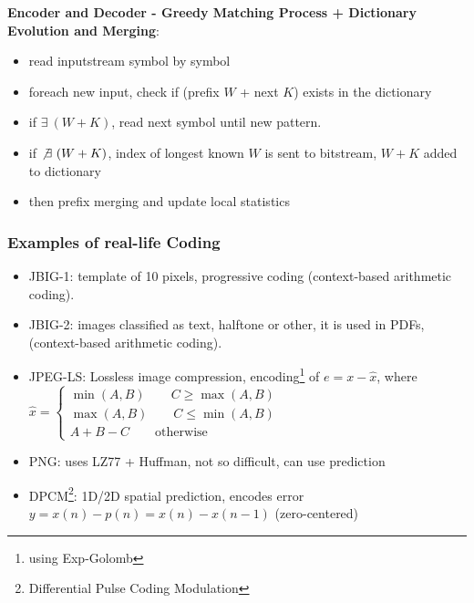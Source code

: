 \textbf{Encoder and Decoder - Greedy Matching Process + Dictionary Evolution and Merging}:
\begin{itemize}
    \item read inputstream symbol by symbol
    \item foreach new input, check if (prefix $W$ + next $K$) exists in the dictionary
    \item if $\exists \ (W+K)$, read next symbol until new pattern.
    \item if $\not\exists\ (W+K)$, index of longest known $W$ is sent to bitstream, $W+K$ added to dictionary
    \item then prefix merging and update local statistics
\end{itemize}
\subsubsection{Examples of real-life Coding}
\begin{itemize}
    \item JBIG-1: template of 10 pixels, progressive coding (context-based arithmetic coding).
    \item JBIG-2: images classified as text, halftone or other, it is used in PDFs, (context-based arithmetic coding).
    \item JPEG-LS: Lossless image compression, encoding\footnote{using Exp-Golomb} of $e = x - \hat{x}$, where $\hat{x} = \begin{cases}
        \min(A,B) \qquad C \geq \max(A,B)\\
        \max(A,B) \qquad C \leq \min(A,B)\\
        A+B-C \qquad \text{otherwise}
    \end{cases}$
    \item PNG: uses LZ77 + Huffman, not so difficult, can use prediction
    \item DPCM\footnote{Differential Pulse Coding Modulation}: 1D/2D spatial prediction, encodes error $y = x(n) - p(n) = x(n)-x(n-1)$ (zero-centered)
\end{itemize}
